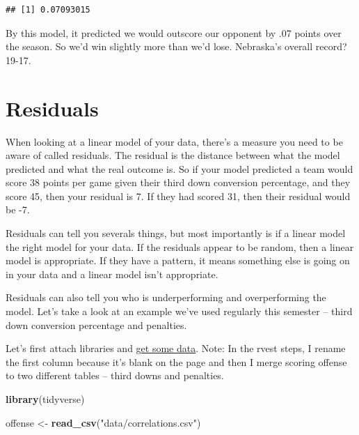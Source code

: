 \documentclass[]{book}
\newenvironment{Shaded}{\begin{snugshade}}{\end{snugshade}}
\newcommand{\KeywordTok}[1]{\textcolor[rgb]{0.13,0.29,0.53}{\textbf{#1}}}
\newcommand{\NormalTok}[1]{#1}
\newcommand{\StringTok}[1]{\textcolor[rgb]{0.31,0.60,0.02}{#1}}
\begin{document}
\begin{verbatim}
## [1] 0.07093015
\end{verbatim}

By this model, it predicted we would outscore our opponent by .07 points over the season. So we'd win slightly more than we'd lose. Nebraska's overall record? 19-17.

\hypertarget{residuals}{%
\chapter{Residuals}\label{residuals}}

When looking at a linear model of your data, there's a measure you need to be aware of called residuals. The residual is the distance between what the model predicted and what the real outcome is. So if your model predicted a team would score 38 points per game given their third down conversion percentage, and they score 45, then your residual is 7. If they had scored 31, then their residual would be -7.

Residuals can tell you severals things, but most importantly is if a linear model the right model for your data. If the residuals appear to be random, then a linear model is appropriate. If they have a pattern, it means something else is going on in your data and a linear model isn't appropriate.

Residuals can also tell you who is underperforming and overperforming the model. Let's take a look at an example we've used regularly this semester -- third down conversion percentage and penalties.

Let's first attach libraries and \href{https://unl.box.com/s/zlxoptqixkt98gubk3i6316qun99l49r}{get some data}. Note: In the rvest steps, I rename the first column because it's blank on the page and then I merge scoring offense to two different tables -- third downs and penalties.

\begin{Shaded}
\begin{Highlighting}[]
\KeywordTok{library}\NormalTok{(tidyverse)}
\end{Highlighting}
\end{Shaded}

\begin{Shaded}
\begin{Highlighting}[]
\NormalTok{offense <-}\StringTok{ }\KeywordTok{read_csv}\NormalTok{(}\StringTok{"data/correlations.csv"}\NormalTok{)}
\end{Highlighting}
\end{Shaded}
\end{document}
